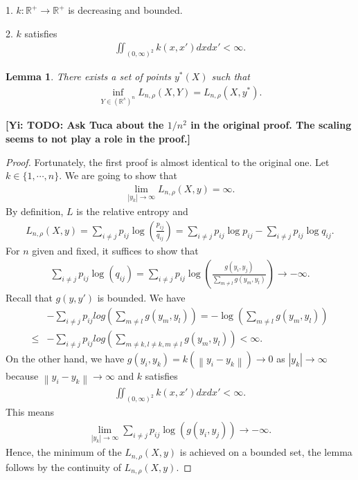 \documentclass[10pt]{article}
\newcommand{\norm}[1]{\left\lVert#1\right\rVert}
\newcommand{\gy}[1]{\textbf{\color{red}[Yi: #1]}}
\newtheorem{lemma}{\bf Lemma}
\newenvironment{Proof of lemma}{\noindent{\bf Proof of Lemma}}{\hfill$\Box$\newline}
\newenvironment{Proof of claim}{\noindent{\bf Proof of claim}}{\hfill$\Box$\newline}
\newenvironment{Proof of theorem}{\noindent{\bf Proof of Theorem}}{\hfill\scriptsize{$\Box$}\newline}
\newenvironment{Proof of theorems}{\noindent{\bf Proof of Theorems}}{\hfill$\Box$\newline}
\newenvironment{Proof of proposition}{\noindent{\bf Proof of Proposition}}{\hfill$\Box$\newline}
\newenvironment{Proof of propositions}{\noindent{\bf Proof of Propositions}}{\hfill$\Box$\newline}
\newenvironment{Proof of exercise}{\noindent{\it Proof of Exercise:}}{\hfill$\Box$}
\numberwithin{equation}{section}
\begin{document}
1. $k: \mathbb{R}^+ \to \mathbb{R}^+$ is decreasing and bounded.

2. $k$ satisfies
\begin{align}
    \iint_{(0,\infty)^2} k(x,x') dxdx' < \infty.
\end{align}

\begin{lemma} \label{lower_bound_lemma_1}
    There exists a set of points $y^*(X)$ such that
    \begin{align}
        \inf_{Y \in (\mathbb{R}^s)^n}L_{n,\rho}(X,Y) = L_{n,\rho}(X,y^*).
    \end{align}
\end{lemma}
\gy{TODO: Ask Tuca about the $1/n^2$ in the original proof. The scaling seems to not play a role in the proof.}
\begin{proof}
    Fortunately, the first proof is almost identical to the original one. Let $k \in \{1,\cdots, n\}$. We are going to show that
    \begin{align}
        \lim_{|y_k| \to \infty} L_{n,\rho}(X,y) = \infty.
    \end{align}
    By definition, $L$ is the relative entropy and
    \begin{align}
        L_{n,\rho}(X,y) = \sum_{i \neq j} p_{ij}\log \left(\frac{p_{ij}}{q_{ij}}\right) = \sum_{i \neq j} p_{ij}\log p_{ij} - \sum_{i \neq j} p_{ij}\log q_{ij}.
    \end{align}
    For $n$ given and fixed, it suffices to show that
    \begin{align}
        \sum_{i \neq j} p_{ij}\log (q_{ij}) = \sum_{i \neq j} p_{ij}\log \left(\frac{g(y_i,y_j)}{\sum_{m \neq l}g(y_m,y_l)}\right) \to -\infty.
    \end{align}
    Recall that $g(y,y')$ is bounded. We have
    \begin{align}
             & -\sum_{i \neq j} p_{ij} log \left(\sum_{m \neq l}g(y_m,y_l) \right) = -\log \left(\sum_{m \neq l}g(y_m,y_l) \right) \nonumber \\
        \leq & -\sum_{i \neq j} p_{ij} log \left(\sum_{m\neq k, l \neq k, m \neq l}g(y_m,y_l) \right) < \infty.
    \end{align}
    On the other hand, we have $g(y_i,y_k) = k (\norm{y_i-y_k}) \to 0$ as $|y_k| \to \infty$ because $\norm{y_i-y_k} \to \infty$ and $k$ satisfies
    \begin{align}
        \iint_{(0,\infty)^2} k(x,x') dxdx' < \infty.
    \end{align}
    This means
    \begin{align}
        \lim_{|y_k| \to \infty}\sum_{i \neq j} p_{ij} \log (g(y_i,y_j)) \to -\infty.
    \end{align}
    Hence, the minimum of the $L_{n,\rho}(X,y)$ is achieved on a bounded set, the lemma follows by the continuity of $L_{n,\rho}(X,y)$.
\end{proof}
\end{document}
